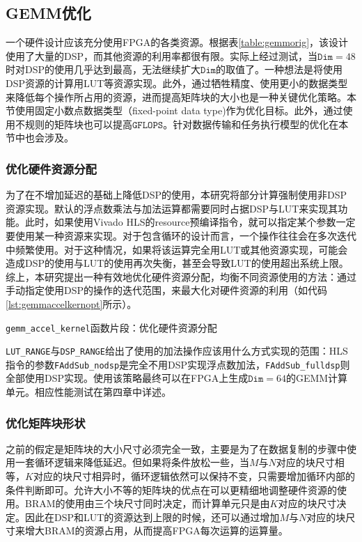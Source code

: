 \subsection{GEMM优化}\label{subsec:gemmopt}

一个硬件设计应该充分使用FPGA的各类资源。根据表\ref{table:gemmorig}，该设计使用了大量的DSP，而其他资源的利用率都很有限。实际上经过测试，当$\mathtt{Dim}=48$时对DSP的使用几乎达到最高，无法继续扩大$\mathtt{Dim}$的取值了。一种想法是将使用DSP资源的计算用LUT等资源实现。此外，通过牺牲精度、使用更小的数据类型来降低每个操作所占用的资源，进而提高矩阵块的大小也是一种关键优化策略。本节使用固定小数点数据类型（fixed-point data type)作为优化目标。此外，通过使用不规则的矩阵块也可以提高$\mathtt{GFLOPS}$。针对数据传输和任务执行模型的优化在本节中也会涉及。

\subsubsection{优化硬件资源分配}

为了在不增加延迟的基础上降低DSP的使用，本研究将部分计算强制使用非DSP资源实现。默认的浮点数乘法与加法运算都需要同时占据DSP与LUT来实现其功能。此时，如果使用Vivado HLS的resource预编译指令，就可以指定某个参数一定要使用某一种资源来实现。对于包含循环的设计而言，一个操作往往会在多次迭代中频繁使用。对于这种情况，如果将该运算完全用LUT或其他资源实现，可能会造成DSP的使用与LUT的使用再次失衡，甚至会导致LUT的使用超出系统上限。综上，本研究提出一种有效地优化硬件资源分配，均衡不同资源使用的方法：通过手动指定使用DSP的操作的迭代范围，来最大化对硬件资源的利用（如代码\ref{lst:gemmaccelkernopt}所示）。

\begin{listing}[!ht]

\caption{\texttt{gemm\_accel\_kernel}函数片段：优化硬件资源分配}
\label{lst:gemmaccelkernopt}
\end{listing}

\texttt{LUT\_RANGE}与\texttt{DSP\_RANGE}给出了使用的加法操作应该用什么方式实现的范围：HLS指令的参数\texttt{FAddSub\_nodsp}是完全不用DSP实现浮点数加法，\texttt{FAddSub\_fulldsp}则全部使用DSP实现。使用该策略最终可以在FPGA上生成$\mathtt{Dim}=64$的GEMM计算单元。相应性能测试在第四章中详述。

\subsubsection{优化矩阵块形状}
之前的假定是矩阵块的大小尺寸必须完全一致，主要是为了在数据复制的步骤中使用一套循环逻辑来降低延迟。但如果将条件放松一些，当$M$与$N$对应的块尺寸相等，$K$对应的块尺寸相异时，循环逻辑依然可以保持不变，只需要增加循环内部的条件判断即可。允许大小不等的矩阵块的优点在可以更精细地调整硬件资源的使用。BRAM的使用由三个块尺寸同时决定，而计算单元只是由$K$对应的块尺寸决定。因此在DSP和LUT的资源达到上限的时候，还可以通过增加$M$与$N$对应的块尺寸来增大BRAM的资源占用，从而提高FPGA每次运算的运算量。

